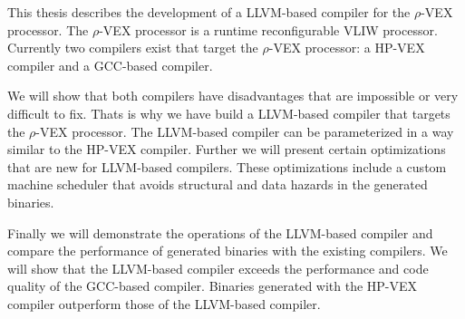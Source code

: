 This thesis describes the development of a LLVM-based compiler for the $\rho$-VEX processor. The $\rho$-VEX processor is a runtime reconfigurable VLIW processor. Currently two compilers exist that target the $\rho$-VEX processor: a HP-VEX compiler and a GCC-based compiler.

We will show that both compilers have disadvantages that are impossible or very difficult to fix. Thats is why we have build a LLVM-based compiler that targets the $\rho$-VEX processor. The LLVM-based compiler can be parameterized in a way similar to the HP-VEX compiler. Further we will present certain optimizations that are new for LLVM-based compilers. These optimizations include a custom machine scheduler that avoids structural and data hazards in the generated binaries.

Finally we will demonstrate the operations of the LLVM-based compiler and compare the performance of generated binaries with the existing compilers. We will show that the LLVM-based compiler exceeds the performance and code quality of the GCC-based compiler. Binaries generated with the HP-VEX compiler outperform those of the LLVM-based compiler.